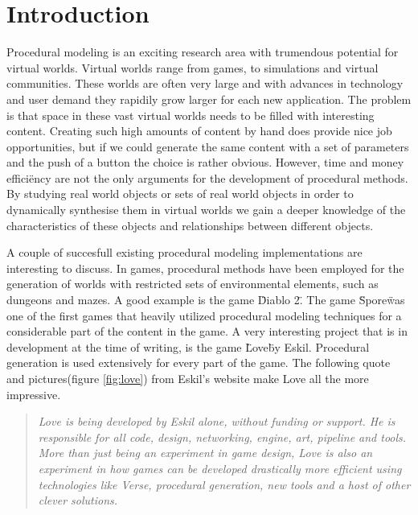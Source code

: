 
\chapter{Introduction}
\label{sec:intro}


Procedural modeling is an exciting research area with trumendous potential for virtual worlds. Virtual worlds range from games, to simulations and virtual communities. These worlds are often very large and with advances in technology and user demand they rapidily grow larger for each new application. The problem is that space in these vast virtual worlds needs to be filled with interesting content. Creating such high amounts of content by hand does provide nice job opportunities, but if we could generate the same content with a set of parameters and the push of a button the choice is rather obvious. However, time and money effici\"ency are not the only arguments for the development of procedural methods. By studying real world objects or sets of real world objects in order to dynamically synthesise them in virtual worlds we gain a deeper knowledge of the characteristics of these objects and relationships between different objects. 

A couple of succesfull existing procedural modeling implementations are interesting to discuss. In games, procedural methods have been employed for the generation of worlds with restricted sets of environmental elements, such as dungeons and mazes. A good example is the game \"Diablo 2\". The game \"Spore\" was one of the first games that heavily utilized procedural modeling techniques for a considerable part of the content in the game. A very interesting project that is in development at the time of writing, is the game \"Love\" by Eskil. Procedural generation is used extensively for every part of the game. The following quote and pictures(figure \ref{fig:love}) from Eskil's website make Love all the more impressive.  

\begin{quote}
\emph{
Love is being developed by Eskil alone, without funding or support. He is responsible for all code, design, networking, engine, art, pipeline and tools. More than just being an experiment in game design, Love is also an experiment in how games can be developed drastically more efficient using technologies like Verse, procedural generation, new tools and a host of other clever solutions.      
}
\end{quote}
      

